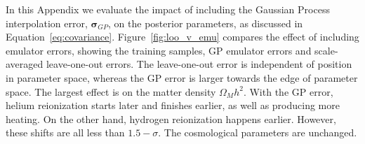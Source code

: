 In this Appendix we evaluate the impact of including the Gaussian Process interpolation error, $\boldsymbol{\sigma}_{GP}$, on the posterior parameters, as discussed in Equation~\ref{eq:covariance}.
Figure~\ref{fig:loo_v_emu} compares the effect of including emulator errors, showing the training samples, GP emulator errors and scale-averaged leave-one-out errors.
The leave-one-out error is independent of position in parameter space, whereas the GP error is larger towards the edge of parameter space.
The largest effect is on the matter density $\Omega_M h^2$. With the GP error, helium reionization starts later and finishes earlier, as well as producing more heating. On the other hand, hydrogen reionization happens earlier. However, these shifts are all less than $1.5-\sigma$. The cosmological parameters are unchanged.







